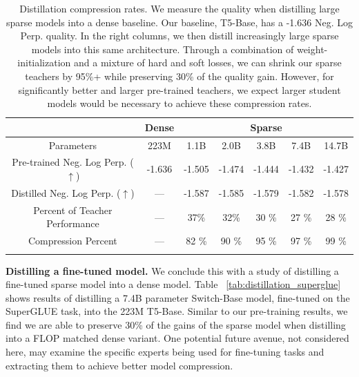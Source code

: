 \documentclass[twoside,11pt]{article}
\begin{document}
\begin{table}[h!]
\centering
\begin{tabular}{cc|ccccc}
    \toprule
    & {Dense} & \multicolumn{5}{c}{Sparse} \\
    \hline
     Parameters & 223M & 1.1B & 2.0B & 3.8B & 7.4B & 14.7B \\ 
     \hline
     Pre-trained Neg. Log Perp. ($\uparrow$) & -1.636 & -1.505 & -1.474 & -1.444 & -1.432 & -1.427 \\
     Distilled Neg. Log Perp. ($\uparrow$) & --- & -1.587 & -1.585 & -1.579 & -1.582 & -1.578 \\ 
     Percent of Teacher Performance & --- & 37\% & 32\% & 30 \% & 27 \% & 28 \% \\
     Compression Percent & --- & 82 \% & 90 \% & 95 \% & 97 \% & 99 \% \\
    \bottomrule
    \label{tab: top1_vs_moe}
\end{tabular}
\caption{Distillation compression rates. We measure the quality when distilling large sparse models into a dense baseline. Our baseline, T5-Base, has a -1.636 Neg. Log Perp. quality. In the right columns, we then distill increasingly large sparse models into this same architecture. Through a combination of weight-initialization and a mixture of hard and soft losses, we can shrink our sparse teachers by 95\%+ while preserving 30\% of the quality gain. 
However, for significantly better and larger pre-trained teachers, we expect larger student models would be necessary to achieve these compression rates.
}
\end{table}

\textbf{Distilling a fine-tuned model.}
We conclude this with a study of distilling a fine-tuned sparse model into a dense model.
Table ~\ref{tab:distillation_superglue} shows results of distilling a 7.4B parameter Switch-Base model, fine-tuned on the SuperGLUE task, into the 223M T5-Base.
Similar to our pre-training results, we find we are able to preserve 30\% of the gains of the sparse model when distilling into a FLOP matched dense variant.
One potential future avenue, not considered here, may examine the specific experts being used for fine-tuning tasks and extracting them to achieve better model compression.
\end{document}
